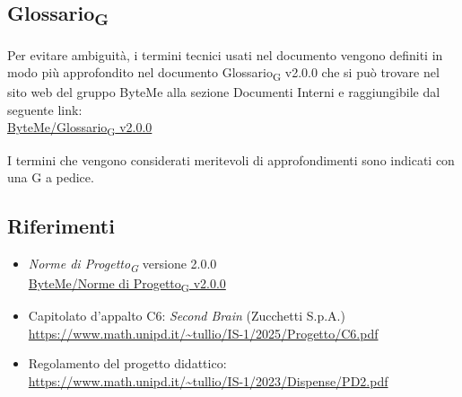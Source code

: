 \documentclass[11pt,a4paper]{article}
\newcommand{\gls}[1]{#1\textsubscript{G}}
\begin{document}
\subsection{\gls{Glossario}}
Per evitare ambiguità, i termini tecnici usati nel documento vengono definiti in modo più approfondito nel documento \gls{Glossario} v2.0.0 che si può trovare nel sito web del gruppo ByteMe alla sezione Documenti Interni e raggiungibile dal seguente link:\\
\href{https://byteme25.github.io/ByteMe/files.html}{ByteMe/\gls{Glossario} v2.0.0}

I termini che vengono considerati meritevoli di approfondimenti sono indicati con una G a pedice.


\subsection{Riferimenti}
\begin{itemize}
  \item \textit{\gls{Norme di Progetto}} versione 2.0.0\\
  \href{https://byteme25.github.io/ByteMe/files.html}{ByteMe/\gls{Norme di Progetto} v2.0.0}
  \item Capitolato d'appalto C6: \textit{Second Brain} (Zucchetti S.p.A.)\\ \url{https://www.math.unipd.it/~tullio/IS-1/2025/Progetto/C6.pdf}
  \item Regolamento del progetto didattico:\\
        \url{https://www.math.unipd.it/~tullio/IS-1/2023/Dispense/PD2.pdf}
\end{itemize}
 
\end{document}
